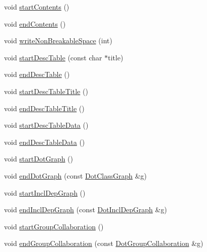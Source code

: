\begin{DoxyCompactItemize}
\item 
void \hyperlink{class_html_generator_a54eaa6e2b9fe8f3aee9eff264da2449e}{start\+Contents} ()
\item 
void \hyperlink{class_html_generator_ada62c0664d53d3e22fffae0503a860f2}{end\+Contents} ()
\item 
void \hyperlink{class_html_generator_aca7f1402f6cc3d9efbe9815ab8de3cc5}{write\+Non\+Breakable\+Space} (int)
\item 
void \hyperlink{class_html_generator_ad238943ff33bd9b0ea5e566f0be9a168}{start\+Desc\+Table} (const char $\ast$title)
\item 
void \hyperlink{class_html_generator_adc3d1eed2818cdd2a01eb1eacc0ad08d}{end\+Desc\+Table} ()
\item 
void \hyperlink{class_html_generator_a3513b8c53063d076b85ffb8e0608cd9d}{start\+Desc\+Table\+Title} ()
\item 
void \hyperlink{class_html_generator_ac070a0a291e13f63c3d17294244960d6}{end\+Desc\+Table\+Title} ()
\item 
void \hyperlink{class_html_generator_acf27d538b5edea06a1ec91813ca059fd}{start\+Desc\+Table\+Data} ()
\item 
void \hyperlink{class_html_generator_a20750bdcf48a3104469275333d41f942}{end\+Desc\+Table\+Data} ()
\item 
void \hyperlink{class_html_generator_ab0139c0d7abf7bca982e9d4360b4ed34}{start\+Dot\+Graph} ()
\item 
void \hyperlink{class_html_generator_a58adba1813ebabd879074371cd56819c}{end\+Dot\+Graph} (const \hyperlink{class_dot_class_graph}{Dot\+Class\+Graph} \&\hyperlink{060__command__switch_8tcl_af08b4b5bfa9edf0b0a7dee1c2b2c29e0}{g})
\item 
void \hyperlink{class_html_generator_a681694b9fbcedc15903e51c95016f711}{start\+Incl\+Dep\+Graph} ()
\item 
void \hyperlink{class_html_generator_a5ea9e86d0086fed794d619899f4014d7}{end\+Incl\+Dep\+Graph} (const \hyperlink{class_dot_incl_dep_graph}{Dot\+Incl\+Dep\+Graph} \&\hyperlink{060__command__switch_8tcl_af08b4b5bfa9edf0b0a7dee1c2b2c29e0}{g})
\item 
void \hyperlink{class_html_generator_a0c2ea1971421f937a4bceaea76aba95a}{start\+Group\+Collaboration} ()
\item 
void \hyperlink{class_html_generator_a9c522d8f611e8008f413d1887ee31d4a}{end\+Group\+Collaboration} (const \hyperlink{class_dot_group_collaboration}{Dot\+Group\+Collaboration} \&\hyperlink{060__command__switch_8tcl_af08b4b5bfa9edf0b0a7dee1c2b2c29e0}{g})

\end{DoxyCompactItemize}
